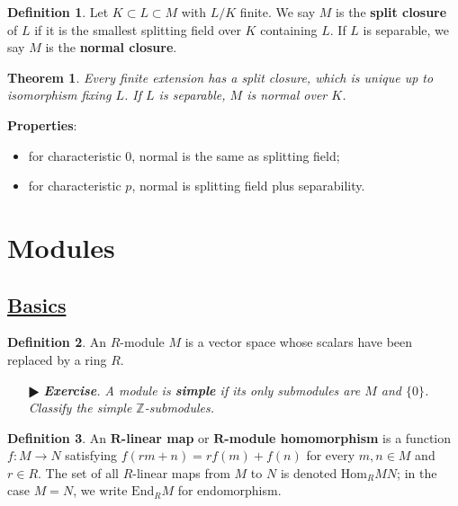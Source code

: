 \documentclass[11pt]{amsart}
\newtheorem*{theorem*}{Theorem}
\theoremstyle{definition}
\newtheorem*{definition*}{Definition}
\renewcommand\:{\colon}
\newcommand{\Z}{\mathds{Z}}
\newcommand{\1}{\mathds{1}}
\newcommand{\End}{\text{End}}
\newcommand{\Hom}{\text{Hom}}
\newcommand{\exc}[1]{\vspace{-2.5pt}\begin{itemize}[leftmargin=15pt]\item[$\RHD$] \textit{\textbf{Exercise}. #1}\end{itemize}}
\begin{document}
\begin{definition*}
	Let $K \subset L \subset M$ with $L/K$ finite. We say $M$ is the \textbf{split closure} of $L$ if it is the smallest splitting field over $K$ containing $L$. If $L$ is separable, we say $M$ is the \textbf{normal closure}.
\end{definition*}

\begin{theorem*}
	Every finite extension has a split closure, which is unique up to isomorphism fixing $L$. If $L$ is separable, $M$ is normal over $K$.
\end{theorem*}

\noindent \textbf{Properties}:
\begin{itemize}[leftmargin=*]\setlength\itemsep{0em}
	\item for characteristic 0, normal is the same as splitting field;
	\item for characteristic $p$, normal is splitting field plus separability.
\end{itemize}



\clearpage









\section{Modules}

\subsection*{\underline{Basics}}

\begin{definition*}
	An $R$-module $M$ is a vector space whose scalars have been replaced by a ring $R$.
\end{definition*}

\exc{A module is \textbf{\textit{simple}} if its only submodules are $M$ and $\{0\}$. Classify the simple $\Z$-submodules.}

\begin{definition*}
	An \textbf{$\boldsymbol{R}$-linear map} or \textbf{$\boldsymbol{R}$-module homomorphism} is a function $f\: M \to N$ satisfying $f(rm + n) = rf(m) + f(n)$ for every $m, n \in M$ and $r \in R$. The set of all $R$-linear maps from $M$ to $N$ is denoted $\Hom_R MN$; in the case $M = N$, we write $\End_R M$ for endomorphism.
\end{definition*}
\end{document}
